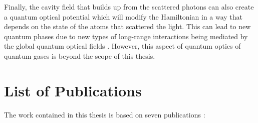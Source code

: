 Finally, the cavity field that builds up from the scattered photons
can also create a quantum optical potential which will modify the
Hamiltonian in a way that depends on the state of the atoms that
scattered the light. This can lead to new quantum phases due to new
types of long-range interactions being mediated by the global quantum
optical fields \cite{caballero2015, caballero2015njp, caballero2016,
  caballero2016a, elliott2016}. However, this aspect of quantum optics
of quantum gases is beyond the scope of this thesis.

\newpage

\section*{List of Publications}

The work contained in this thesis is based on seven publications
\cite{kozlowski2015, elliott2015, atoms2015, mazzucchi2016,
  kozlowski2016zeno, mazzucchi2016njp, kozlowski2016phase}:

